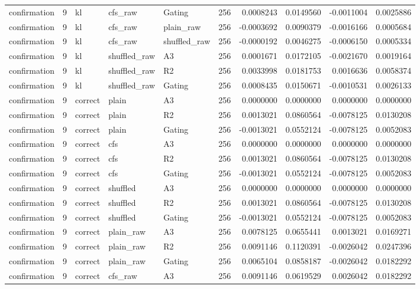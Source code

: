 \begin{tabular}{lrlllrrrrr}
confirmation & 9 & kl & cfs_raw & Gating & 256 & 0.0008243 & 0.0149560 & -0.0011004 & 0.0025886 \\
confirmation & 9 & kl & cfs_raw & plain_raw & 256 & -0.0003692 & 0.0090379 & -0.0016166 & 0.0005684 \\
confirmation & 9 & kl & cfs_raw & shuffled_raw & 256 & -0.0000192 & 0.0046275 & -0.0006150 & 0.0005334 \\
confirmation & 9 & kl & shuffled_raw & A3 & 256 & 0.0001671 & 0.0172105 & -0.0021670 & 0.0019164 \\
confirmation & 9 & kl & shuffled_raw & R2 & 256 & 0.0033998 & 0.0181753 & 0.0016636 & 0.0058374 \\
confirmation & 9 & kl & shuffled_raw & Gating & 256 & 0.0008435 & 0.0150671 & -0.0010531 & 0.0026133 \\
confirmation & 9 & correct & plain & A3 & 256 & 0.0000000 & 0.0000000 & 0.0000000 & 0.0000000 \\
confirmation & 9 & correct & plain & R2 & 256 & 0.0013021 & 0.0860564 & -0.0078125 & 0.0130208 \\
confirmation & 9 & correct & plain & Gating & 256 & -0.0013021 & 0.0552124 & -0.0078125 & 0.0052083 \\
confirmation & 9 & correct & cfs & A3 & 256 & 0.0000000 & 0.0000000 & 0.0000000 & 0.0000000 \\
confirmation & 9 & correct & cfs & R2 & 256 & 0.0013021 & 0.0860564 & -0.0078125 & 0.0130208 \\
confirmation & 9 & correct & cfs & Gating & 256 & -0.0013021 & 0.0552124 & -0.0078125 & 0.0052083 \\
confirmation & 9 & correct & shuffled & A3 & 256 & 0.0000000 & 0.0000000 & 0.0000000 & 0.0000000 \\
confirmation & 9 & correct & shuffled & R2 & 256 & 0.0013021 & 0.0860564 & -0.0078125 & 0.0130208 \\
confirmation & 9 & correct & shuffled & Gating & 256 & -0.0013021 & 0.0552124 & -0.0078125 & 0.0052083 \\
confirmation & 9 & correct & plain_raw & A3 & 256 & 0.0078125 & 0.0655441 & 0.0013021 & 0.0169271 \\
confirmation & 9 & correct & plain_raw & R2 & 256 & 0.0091146 & 0.1120391 & -0.0026042 & 0.0247396 \\
confirmation & 9 & correct & plain_raw & Gating & 256 & 0.0065104 & 0.0858187 & -0.0026042 & 0.0182292 \\
confirmation & 9 & correct & cfs_raw & A3 & 256 & 0.0091146 & 0.0619529 & 0.0026042 & 0.0182292 \\

\end{tabular}
